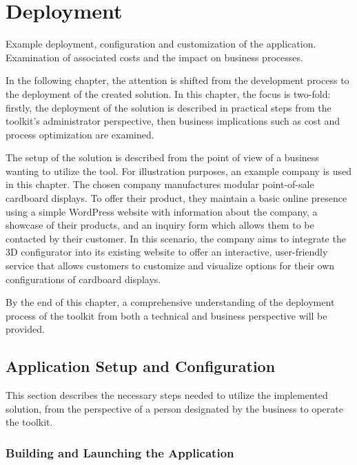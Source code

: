 \chapter{Deployment}

\begin{chapterabstract}
    Example deployment, configuration and customization of the application. Examination of associated costs and the impact on business processes.
\end{chapterabstract}

In the following chapter, the attention is shifted from the development process to the deployment of the created solution. In this chapter, the focus is two-fold: firstly, the deployment of the solution is described in practical steps from the toolkit's administrator perspective, then business implications such as cost and process optimization are examined.

The setup of the solution is described from the point of view of a business wanting to utilize the tool. For illustration purposes, an example company is used in this chapter. The chosen company manufactures modular point-of-sale cardboard displays. To offer their product, they maintain a basic online presence using a simple WordPress website with information about the company, a showcase of their products, and an inquiry form which allows them to be contacted by their customer. In this scenario, the company aims to integrate the 3D configurator into its existing website to offer an interactive, user-friendly service that allows customers to customize and visualize options for their own configurations of cardboard displays.

By the end of this chapter, a comprehensive understanding of the deployment process of the toolkit from both a technical and business perspective will be provided.


\section{Application Setup and Configuration}

This section describes the necessary steps needed to utilize the implemented solution, from the perspective of a person designated by the business to operate the toolkit.


\subsection{Building and Launching the Application}

